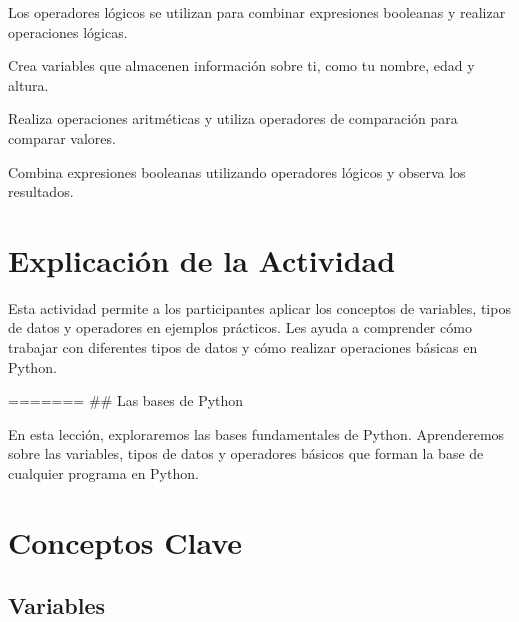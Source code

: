 \documentclass[
  a4paper,
  onepage,
  openany]{scrreprt}
\begin{document}
Los operadores lógicos se utilizan para combinar expresiones booleanas y
realizar operaciones lógicas.

\begin{tcolorbox}[enhanced jigsaw, breakable, opacityback=0, toptitle=1mm, coltitle=black, toprule=.15mm, rightrule=.15mm, colframe=quarto-callout-important-color-frame, opacitybacktitle=0.6, arc=.35mm, title=\textcolor{quarto-callout-important-color}{\faExclamation}\hspace{0.5em}{Actividad Práctica:}, titlerule=0mm, colbacktitle=quarto-callout-important-color!10!white, bottomtitle=1mm, bottomrule=.15mm, colback=white, left=2mm, leftrule=.75mm]

Crea variables que almacenen información sobre ti, como tu nombre, edad
y altura.

Realiza operaciones aritméticas y utiliza operadores de comparación para
comparar valores.

Combina expresiones booleanas utilizando operadores lógicos y observa
los resultados.

\end{tcolorbox}

\hypertarget{explicaciuxf3n-de-la-actividad-4}{%
\section{Explicación de la
Actividad}\label{explicaciuxf3n-de-la-actividad-4}}

Esta actividad permite a los participantes aplicar los conceptos de
variables, tipos de datos y operadores en ejemplos prácticos. Les ayuda
a comprender cómo trabajar con diferentes tipos de datos y cómo realizar
operaciones básicas en Python.

======= \#\# Las bases de Python

En esta lección, exploraremos las bases fundamentales de Python.
Aprenderemos sobre las variables, tipos de datos y operadores básicos
que forman la base de cualquier programa en Python.

\hypertarget{conceptos-clave-5}{%
\section{Conceptos Clave}\label{conceptos-clave-5}}

\hypertarget{variables-1}{%
\subsection{Variables}\label{variables-1}}
\end{document}
